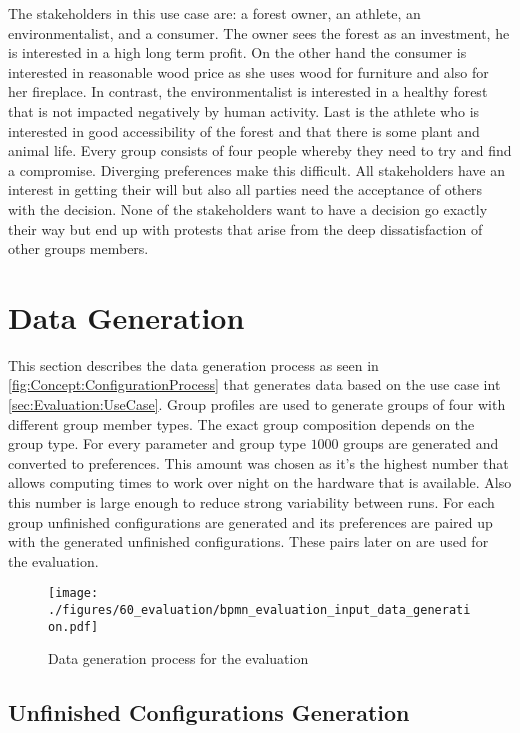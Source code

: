 The stakeholders in this use case are: a forest owner, an athlete, an environmentalist, and a consumer. The owner sees the forest as an investment, he is interested in a high long term profit. On the other hand the consumer is interested in reasonable wood price as she uses wood for furniture and also for her fireplace. In contrast, the environmentalist is interested in a healthy forest that is not impacted negatively by human activity. Last is the athlete who is interested in good accessibility of the forest and that there is some plant and animal life.
Every group consists of four people whereby they need to try and find a compromise. Diverging preferences make this difficult. All stakeholders have an interest in getting their will but also all parties need the acceptance of others with the decision. None of the stakeholders want to have a decision go exactly their way but end up with protests that arise from the deep dissatisfaction of other groups members.

\section{Data Generation}
\label{sec:Evaluation:GeneratingGroups}

This section describes the data generation process as seen in \autoref{fig:Concept:ConfigurationProcess} that generates data based on the use case int  \autoref{sec:Evaluation:UseCase}. Group profiles are used to generate groups of four with different group member types. The exact group composition depends on the group type. For every parameter and group type $1000$ groups are generated and converted to preferences. This amount was chosen as it's the highest number that allows computing times to work over night on the hardware that is available. Also this number is large enough to reduce strong variability between runs. For each group unfinished configurations are generated and its preferences are paired up with the generated unfinished configurations. These pairs later on are used for the evaluation. 

\begin{figure}
    \centering
    \texttt{[image: ./figures/60\_evaluation/bpmn\_evaluation\_input\_data\_generation.pdf]}
    \caption{Data generation process for the evaluation}
    \label{fig:Evaluation:GeneratingDataProcess}
\end{figure}

\subsection{Unfinished Configurations Generation}


